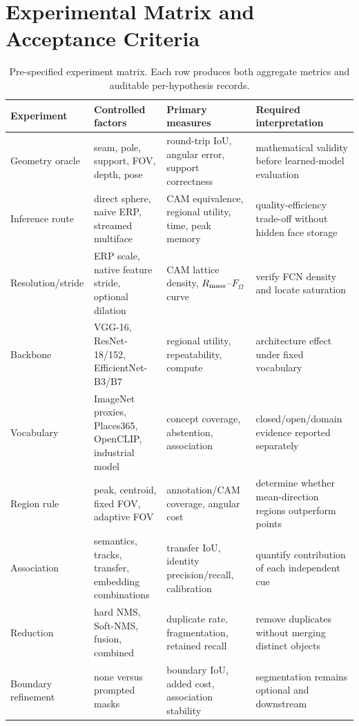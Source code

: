 \documentclass[a4paper,9pt]{extarticle}
\begin{document}
\section{Experimental Matrix and Acceptance Criteria}

\begin{table}[t]
\centering
\caption{Pre-specified experiment matrix. Each row produces both aggregate metrics and auditable per-hypothesis records.}
\label{tab:matrix}
\begin{tabular}{@{}p{24mm}p{39mm}p{41mm}p{47mm}@{}}
\toprule
Experiment & Controlled factors & Primary measures & Required interpretation\\
\midrule
Geometry oracle & seam, pole, support, FOV, depth, pose & round-trip IoU, angular error, support correctness & mathematical validity before learned-model evaluation\\
Inference route & direct sphere, naive ERP, streamed multiface & CAM equivalence, regional utility, time, peak memory & quality-efficiency trade-off without hidden face storage\\
Resolution/stride & ERP scale, native feature stride, optional dilation & CAM lattice density, $R_{\rm mass}$--$F_\Omega$ curve & verify FCN density and locate saturation\\
Backbone & VGG-16, ResNet-18/152, EfficientNet-B3/B7 & regional utility, repeatability, compute & architecture effect under fixed vocabulary\\
Vocabulary & ImageNet proxies, Places365, OpenCLIP, industrial model & concept coverage, abstention, association & closed/open/domain evidence reported separately\\
Region rule & peak, centroid, fixed FOV, adaptive FOV & annotation/CAM coverage, angular cost & determine whether mean-direction regions outperform points\\
Association & semantics, tracks, transfer, embedding combinations & transfer IoU, identity precision/recall, calibration & quantify contribution of each independent cue\\
Reduction & hard NMS, Soft-NMS, fusion, combined & duplicate rate, fragmentation, retained recall & remove duplicates without merging distinct objects\\
Boundary refinement & none versus prompted masks & boundary IoU, added cost, association stability & segmentation remains optional and downstream\\
\bottomrule
\end{tabular}
\end{table}
\end{document}
